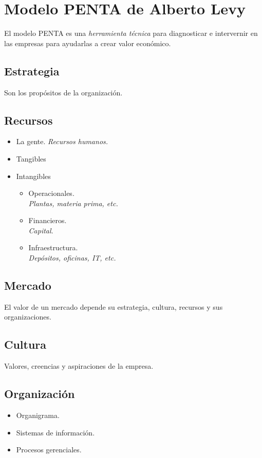 \documentclass[spanish, twocolumn, twoside,openany]{book}
\begin{document}
\chapter{Modelo PENTA de Alberto Levy}

El modelo PENTA es una \emph{herramienta técnica} para diagnosticar e intervernir en las empresas para ayudarlas a crear valor económico.

\section{Estrategia}
Son los propósitos de la organización.

\section{Recursos}

\begin{itemize}
	\item La gente. \textit{Recursos humanos.}
	\item Tangibles
	\item Intangibles
		\begin{itemize}
			\item Operacionales.\\
			\textit{Plantas, materia prima, etc.}
			\item Financieros.\\
			\textit{Capital}.
			\item Infraestructura. \\
			\textit{Depósitos, oficinas, IT, etc.}
		\end{itemize}
\end{itemize}

\section{Mercado}

El valor de un mercado depende su estrategia, cultura, recursos y sus organizaciones.

\section{Cultura}
Valores, creencias y aspiraciones de la empresa.

\section{Organización}
\begin{itemize}
	\item Organigrama.
	\item Sistemas de información.
	\item Procesos gerenciales.
\end{itemize}
\end{document}
